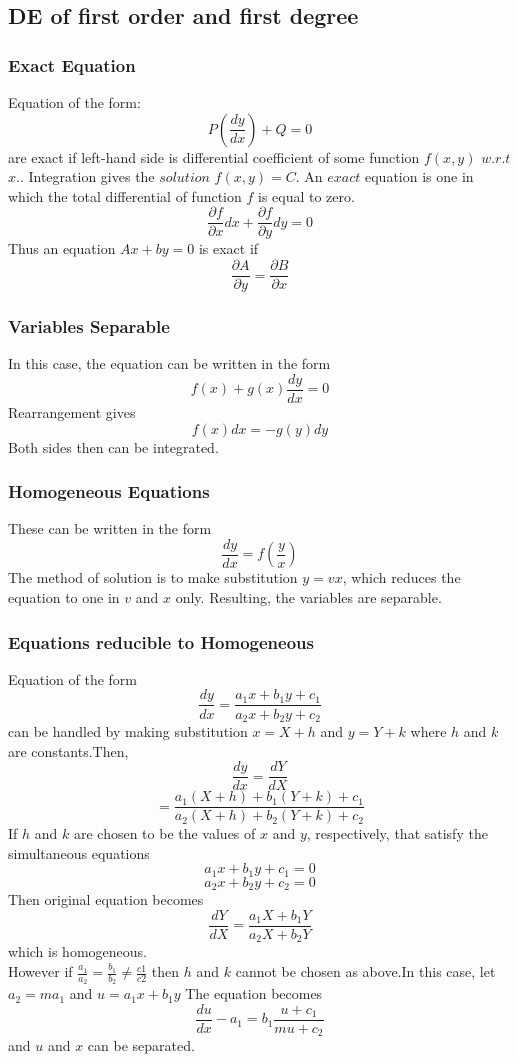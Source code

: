 \documentclass[12pt]{article}
\begin{document}
\subsection{DE of first order and first degree}
\subsubsection{Exact Equation}
Equation of the form: $$P(\frac{dy}{dx})+	Q=0$$ are exact if left-hand side is differential coefficient of some function $f(x,y)$ $w.r.t$ $x.$. Integration gives the $solution$ $f(x,y)=C$. An $exact$ equation is one in which the total differential of function $f$ is equal to zero.
$$\frac{\partial f}{\partial x}dx+\frac{\partial f}{\partial y}dy=0$$
Thus an equation $Ax+by=0$ is exact if
$$\frac{\partial A}{\partial y}=\frac{\partial B}{\partial x}$$
\subsubsection{Variables Separable}
In this case, the equation can be written in the form $$f(x)+g(x)\frac{dy}{dx}=0$$ Rearrangement gives $$f(x)dx=-g(y)dy$$
Both sides then can be integrated.
\subsubsection{Homogeneous Equations}
These can be written in the form
$$\frac{dy}{dx}=f(\frac{y}{x})$$
The method of solution is to make substitution $y=vx$, which reduces the equation to one in $v$ and $x$ only. Resulting, the variables are separable.
\subsubsection{Equations reducible to Homogeneous}
Equation of the form  $$\frac{dy}{dx}=\frac{a_1x+b_1y+c_1}{a_2x+b_2y+c_2}$$ can be handled by making substitution $x=X+h$
and $y=Y+k$ where $h$ and $k$ are constants.Then, $$\frac{dy}{dx}=\frac{dY}{dX}$$ $$=\frac{a_1(X+h)+b_1(Y+k)+c_1}{a_2(X+h)+b_2(Y+k)+c_2}$$
If $h$ and $k$ are chosen to be the values of $x$ and $y$, respectively, that satisfy the simultaneous equations
$$a_1x+b_1y+c_1=0$$
$$a_2x+b_2y+c_2=0$$
Then original equation becomes $$\frac{dY}{dX}=\frac{a_1X+b_1Y}{a_2X+b_2Y}$$ which is homogeneous. \\
However if $\frac{a_1}{a_2}=\frac{b_1}{b_2} \not= \frac{c1}{c2}$ then $h$ and $k$ cannot be chosen as above.In this case, let $a_2=ma_1$ and $u=a_1x+b_1y$ The equation becomes $$\frac{du}{dx}-a_1=b_1 \frac{u+c_1}{mu+c_2}$$ and $u$ and $x$ can be separated.
\end{document}
